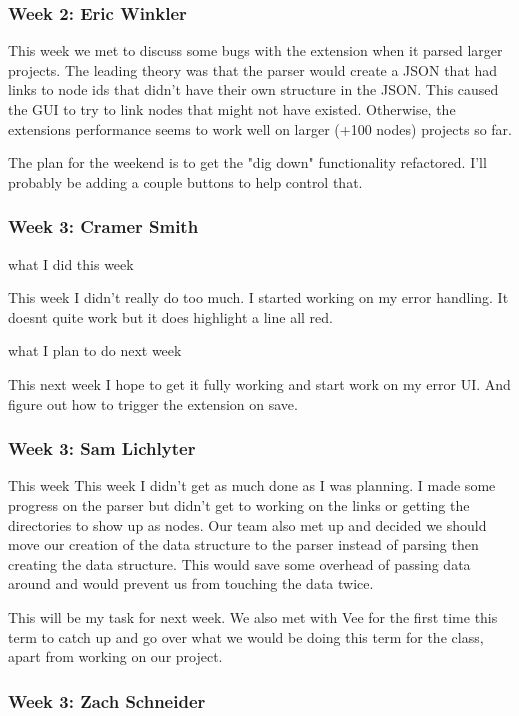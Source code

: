 \subsubsection{Week 2: Eric Winkler}

This week we met to discuss some bugs with the extension when it parsed larger projects. The leading theory was that the parser would create a JSON that had links to node ids that didn't have their own structure in the JSON. This caused the GUI to try to link nodes that might not have existed. Otherwise, the extensions performance seems to work well on larger (+100 nodes) projects so far.

The plan for the weekend is to get the "dig down" functionality refactored. I'll probably be adding a couple buttons to help control that.

\subsubsection{Week 3: Cramer Smith}

what I did this week

This week I didn't really do too much. I started working on my error handling. It doesnt quite work but it does highlight a line all red.

what I plan to do next week 

This next week I hope to get it fully working and start work on my error UI. And figure out how to trigger the extension on save.

\subsubsection{Week 3: Sam Lichlyter}

This week
This week I didn't get as much done as I was planning. I made some progress on the parser but didn't get to working on the links or getting the directories to show up as nodes. Our team also met up and decided we should move our creation of the data structure to the parser instead of parsing then creating the data structure. This would save some overhead of passing data around and would prevent us from touching the data twice.

This will be my task for next week. We also met with Vee for the first time this term to catch up and go over what we would be doing this term for the class, apart from working on our project.

\subsubsection{Week 3: Zach Schneider}


